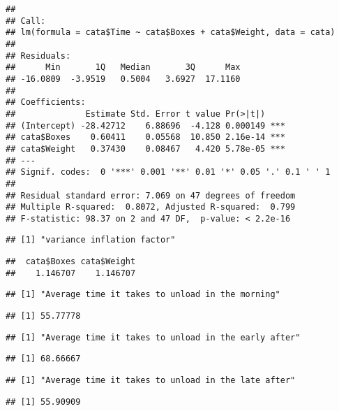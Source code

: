 \documentclass[]{article}
\newenvironment{Shaded}{\begin{snugshade}}{\end{snugshade}}
\newcommand{\DataTypeTok}[1]{\textcolor[rgb]{0.13,0.29,0.53}{#1}}
\newcommand{\KeywordTok}[1]{\textcolor[rgb]{0.13,0.29,0.53}{\textbf{#1}}}
\newcommand{\NormalTok}[1]{#1}
\newcommand{\OperatorTok}[1]{\textcolor[rgb]{0.81,0.36,0.00}{\textbf{#1}}}
\newcommand{\StringTok}[1]{\textcolor[rgb]{0.31,0.60,0.02}{#1}}
\begin{document}
\begin{Shaded}
\end{Shaded}

\begin{verbatim}
## 
## Call:
## lm(formula = cata$Time ~ cata$Boxes + cata$Weight, data = cata)
## 
## Residuals:
##      Min       1Q   Median       3Q      Max 
## -16.0809  -3.9519   0.5004   3.6927  17.1160 
## 
## Coefficients:
##              Estimate Std. Error t value Pr(>|t|)    
## (Intercept) -28.42712    6.88696  -4.128 0.000149 ***
## cata$Boxes    0.60411    0.05568  10.850 2.16e-14 ***
## cata$Weight   0.37430    0.08467   4.420 5.78e-05 ***
## ---
## Signif. codes:  0 '***' 0.001 '**' 0.01 '*' 0.05 '.' 0.1 ' ' 1
## 
## Residual standard error: 7.069 on 47 degrees of freedom
## Multiple R-squared:  0.8072, Adjusted R-squared:  0.799 
## F-statistic: 98.37 on 2 and 47 DF,  p-value: < 2.2e-16
\end{verbatim}

\begin{verbatim}
## [1] "variance inflation factor"
\end{verbatim}

\begin{verbatim}
##  cata$Boxes cata$Weight 
##    1.146707    1.146707
\end{verbatim}

\begin{verbatim}
## [1] "Average time it takes to unload in the morning"
\end{verbatim}

\begin{verbatim}
## [1] 55.77778
\end{verbatim}

\begin{verbatim}
## [1] "Average time it takes to unload in the early after"
\end{verbatim}

\begin{verbatim}
## [1] 68.66667
\end{verbatim}

\begin{verbatim}
## [1] "Average time it takes to unload in the late after"
\end{verbatim}

\begin{verbatim}
## [1] 55.90909
\end{verbatim}
\end{document}
